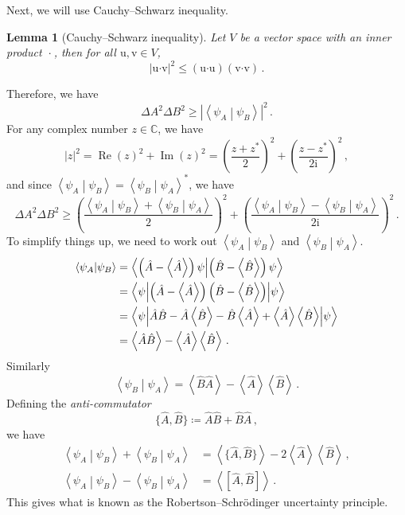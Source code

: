 \documentclass{article}
\theoremstyle{plain}\theoremheaderfont{\normalfont\itshape}\theorembodyfont{\rmfamily}\theoremseparator{.}\newtheorem*{rem}{Remark}\newtheorem*{ex}{Example}\newtheorem*{proof}{Proof}\newtheorem*{altp}{Alternative proof}
\theoremstyle{plain}\theoremheaderfont{\normalfont\bfseries}\theorembodyfont{\rmfamily}\theoremseparator{.}\newtheorem{thm}{Theorem}[section]\newtheorem{lem}[thm]{Lemma}\newtheorem{prop}[thm]{Proposition}\newtheorem*{cor}{Corollary}\newtheorem{defn}[thm]{Definition}\newtheorem{clm}[thm]{Claim}\newtheorem{clminproof}{Claim}
\theoremstyle{break}\theoremheaderfont{\normalfont\itshape}\theorembodyfont{\rmfamily}\theoremseparator{.\medskip}\newtheorem*{proofskip}{Proof}\newtheorem*{exs}{Examples}\newtheorem*{rems}{Remarks}
\theoremstyle{break}\theoremheaderfont{\normalfont\bfseries}\theorembodyfont{\rmfamily}\theoremseparator{.\medskip}\newtheorem{lemskip}[thm]{Lemma}\newtheorem{defnskip}[thm]{Definition}\newtheorem{propskip}[thm]{Proposition}\newtheorem{thmskip}[thm]{Theorem}
\numberwithin{equation}{section}
\newcommand{\ii}{\mathrm{i}}
\newcommand{\braket}[2]{\left\langle #1 \middle| #2 \right\rangle}
\newcommand{\eval}[1]{\left\langle #1 \right\rangle}
\newcommand{\expval}[2]{\left\langle #2 \middle| #1 \middle| #2 \right\rangle}
\newcommand{\vb}[1]{\bm{\mathrm{#1}}}
\newcommand{\vdot}{\bm{\cdot}}
\newcommand{\abs}[1]{\left| #1 \right|}
\renewcommand{\Re}{\operatorname{Re}}
\renewcommand{\Im}{\operatorname{Im}}
\newcommand{\CC}{\mathbb{C}}
\begin{document}
    Next, we will use Cauchy--Schwarz inequality.
    \begin{lem}[Cauchy--Schwarz inequality]
        Let \(V\) be a vector space with an inner product \(\ \vdot\ \), then for all \(\vb{u},\vb{v}\in V\),
        \begin{equation}
            \abs{\vb{u}\vdot\vb{v}}^2\le(\vb{u}\vdot\vb{u})(\vb{v}\vdot\vb{v})\,.
        \end{equation}
    \end{lem}
    Therefore, we have
    \begin{equation}
        \Delta A^2\Delta B^2\ge\abs{\braket{\psi_A}{\psi_B}}^2\,.
    \end{equation}
    For any complex number \(z\in\CC\), we have
    \begin{equation}
        \abs{z}^2=\Re(z)^2+\Im(z)^2=\left(\frac{z+z^*}{2}\right)^2+\left(\frac{z-z^*}{2\ii}\right)^2\,,
    \end{equation}
    and since \(\braket{\psi_A}{\psi_B}=\braket{\psi_B}{\psi_A}^*\), we have
    \begin{equation}
        \Delta A^2\Delta B^2\ge\left(\frac{\braket{\psi_A}{\psi_B}+\braket{\psi_B}{\psi_A}}{2}\right)^2+\left(\frac{\braket{\psi_A}{\psi_B}-\braket{\psi_B}{\psi_A}}{2\ii}\right)^2\,.
    \end{equation}
    To simplify things up, we need to work out \(\braket{\psi_A}{\psi_B}\) and \(\braket{\psi_B}{\psi_A}\).
    \begin{align}
        \braket{\psi_A}{\psi_B}&=\braket{\left(\hat{A}-\eval{\hat{A}}\right)\psi}{\left(\hat{B}-\eval{\hat{B}}\right)\psi}\notag\\
        &=\expval{\left(\hat{A}-\eval{\hat{A}}\right)\left(\hat{B}-\eval{\hat{B}}\right)}{\psi}\notag\\
        &=\expval{\hat{A}\hat{B}-\hat{A}\eval{\hat{B}}-\hat{B}\eval{\hat{A}}+\eval{\hat{A}}\eval{\hat{B}}}{\psi}\notag\\
        &=\eval{\hat{A}\hat{B}}-\eval{\hat{A}}\eval{\hat{B}}\,.
    \end{align}
    Similarly
    \begin{equation}
        \braket{\psi_B}{\psi_A}=\eval{\hat{B}\hat{A}}-\eval{\hat{A}}\eval{\hat{B}}\,.
    \end{equation}
    Defining the \textit{anti-commutator}
    \begin{equation}
        \{\hat{A},\hat{B}\}\coloneqq\hat{A}\hat{B}+\hat{B}\hat{A}\,,
    \end{equation}
    we have
    \begin{align}
        \braket{\psi_A}{\psi_B}+\braket{\psi_B}{\psi_A}&=\eval{\{\hat{A},\hat{B}\}}-2\eval{\hat{A}}\eval{\hat{B}}\,,\\
        \braket{\psi_A}{\psi_B}-\braket{\psi_B}{\psi_A}&=\eval{[\hat{A},\hat{B}]}\,.
    \end{align}
    This gives what is known as the Robertson--Schr\"{o}dinger uncertainty principle.
\end{document}
